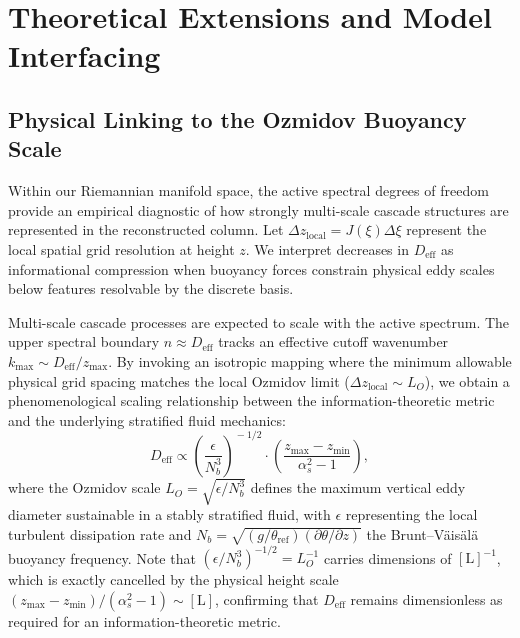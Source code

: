 \section{Theoretical Extensions and Model Interfacing}
\label{sec:extensions}

\subsection{Physical Linking to the Ozmidov Buoyancy Scale}
\label{sec:extensions:ozmidov}

Within our Riemannian manifold space, the active spectral degrees of freedom provide an empirical diagnostic of how strongly multi-scale cascade structures are represented in the reconstructed column. Let $\Delta z_{\mathrm{local}} = J(\xi) \Delta \xi$ represent the local spatial grid resolution at height $z$. We interpret decreases in $D_{\mathrm{eff}}$ as informational compression when buoyancy forces constrain physical eddy scales below features resolvable by the discrete basis.

Multi-scale cascade processes are expected to scale with the active spectrum. The upper spectral boundary $n \approx D_{\mathrm{eff}}$ tracks an effective cutoff wavenumber $k_{\max} \sim D_{\mathrm{eff}} / z_{\max}$. By invoking an isotropic mapping where the minimum allowable physical grid spacing matches the local Ozmidov limit ($\Delta z_{\mathrm{local}} \sim L_O$), we obtain a phenomenological scaling relationship between the information-theoretic metric and the underlying stratified fluid mechanics:
\begin{equation}
D_{\mathrm{eff}} \propto \left( \frac{\epsilon}{N_b^3} \right)^{\!-1/2} \cdot \left( \frac{z_{\max} - z_{\min}}{\alpha_s^2 - 1} \right),
\label{eq:d_eff_ozmidov_scaling}
\end{equation}
where the Ozmidov scale $L_O = \sqrt{\epsilon / N_b^3}$ defines the maximum vertical eddy diameter sustainable in a stably stratified fluid, with $\epsilon$ representing the local turbulent dissipation rate and $N_b = \sqrt{(g/\theta_{\mathrm{ref}}) (\partial \theta / \partial z)}$ the Brunt--Väisälä buoyancy frequency. Note that $(\epsilon / N_b^3)^{-1/2} = L_O^{-1}$ carries dimensions of $[\mathrm{L}]^{-1}$, which is exactly cancelled by the physical height scale $(z_{\max} - z_{\min})/(\alpha_s^2 - 1) \sim [\mathrm{L}]$, confirming that $D_{\mathrm{eff}}$ remains dimensionless as required for an information-theoretic metric.

